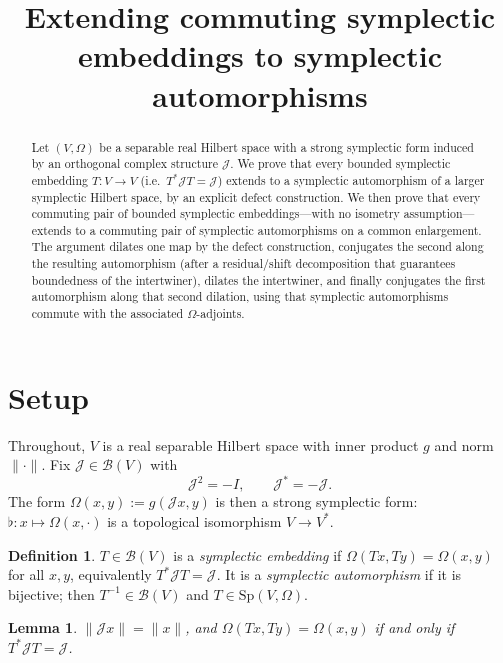 \documentclass[11pt,a4paper]{article}
\title{Extending commuting symplectic embeddings to symplectic automorphisms}
\author{}
\date{}
\newtheorem{lemma}[theorem]{Lemma}
\theoremstyle{definition}
\newtheorem{definition}[theorem]{Definition}
\newcommand{\cJ}{\mathcal{J}}
\begin{document}
\maketitle

\begin{abstract}
Let \((V,\Omega)\) be a separable real Hilbert space with a strong symplectic form induced by an
orthogonal complex structure \(\cJ\). We prove that every bounded symplectic embedding
\(T:V\to V\) (i.e.\ \(T^*\cJ T=\cJ\)) extends to a symplectic automorphism of a larger
symplectic Hilbert space, by an explicit defect construction. We then prove that every
commuting pair of bounded symplectic embeddings---with no isometry assumption---extends to a
commuting pair of symplectic automorphisms on a common enlargement. The argument dilates one
map by the defect construction, conjugates the second along the resulting automorphism (after a
residual/shift decomposition that guarantees boundedness of the intertwiner), dilates the
intertwiner, and finally conjugates the first automorphism along that second dilation, using that
symplectic automorphisms commute with the associated \(\Omega\)-adjoints.
\end{abstract}

\tableofcontents

\section{Setup}

Throughout, \(V\) is a real separable Hilbert space with inner product \(g\) and norm
\(\|\cdot\|\). Fix \(\cJ\in\mathcal{B}(V)\) with
\begin{equation}
\label{eq:J}
\cJ^2=-I,\qquad \cJ^*=-\cJ.
\end{equation}
The form \(\Omega(x,y):=g(\cJ x,y)\) is then a strong symplectic form: \(\flat:x\mapsto\Omega(x,\cdot)\)
is a topological isomorphism \(V\to V^*\).

\begin{definition}
\(T\in\mathcal{B}(V)\) is a \emph{symplectic embedding} if \(\Omega(Tx,Ty)=\Omega(x,y)\) for all
\(x,y\), equivalently \(T^*\cJ T=\cJ\). It is a \emph{symplectic automorphism} if it is bijective;
then \(T^{-1}\in\mathcal{B}(V)\) and \(T\in\mathrm{Sp}(V,\Omega)\).
\end{definition}

\begin{lemma}
\label{lem:basic}
\(\|\cJ x\|=\|x\|\), and \(\Omega(Tx,Ty)=\Omega(x,y)\) if and only if \(T^*\cJ T=\cJ\).
\end{lemma}
\end{document}
